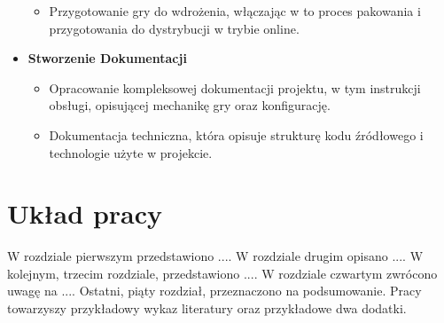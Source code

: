 \begin{itemize}
\begin{itemize}
	\item Przygotowanie gry do wdrożenia, włączając w to proces pakowania i przygotowania do dystrybucji w trybie online.
\end{itemize}
\item \textbf{Stworzenie Dokumentacji}
\begin{itemize}
	\item Opracowanie kompleksowej dokumentacji projektu, w tym instrukcji obsługi, opisującej mechanikę gry oraz konfigurację.
	\item Dokumentacja techniczna, która opisuje strukturę kodu źródłowego i technologie użyte w projekcie.
\end{itemize}
\end{itemize}

\section{Układ pracy}
W rozdziale pierwszym przedstawiono ....
W rozdziale drugim opisano ....
W kolejnym, trzecim rozdziale, przedstawiono ....
W rozdziale czwartym zwrócono uwagę na ....
Ostatni, piąty rozdział, przeznaczono na podsumowanie.
Pracy towarzyszy przykładowy wykaz literatury oraz przykładowe dwa dodatki. 

